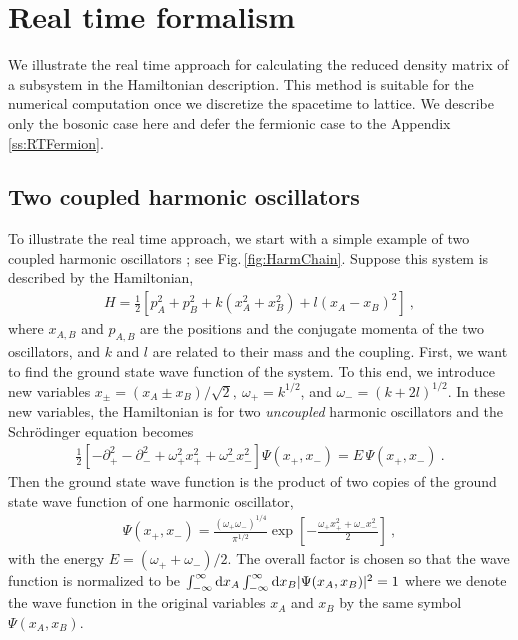 \section{Real time formalism}\label{ss:RTapproach}
We illustrate the real time approach for calculating the reduced density matrix of a subsystem in the Hamiltonian description.
This method is suitable for the numerical computation once we discretize the spacetime to lattice.
We describe only the bosonic case here and defer the fermionic case to the Appendix \ref{ss:RTFermion}.

\subsection{Two coupled harmonic oscillators}
To illustrate the real time approach, we start with a simple example of two coupled harmonic oscillators \cite{Srednicki:1993im,Bombelli:1986rw}; see Fig.\,\ref{fig:HarmChain}.
Suppose this system is described by the Hamiltonian,
\begin{align}\label{TwoHarmH}
H = \frac{1}{2}\left[ p_A^2 + p_B^2 + k(x_A^2 + x_B^2) + l (x_A - x_B)^2 \right] \ ,
\end{align}
where $x_{A,B}$ and $p_{A,B}$ are the positions and the conjugate momenta of the two oscillators, and $k$ and $l$ are related to their mass and the coupling.
First, we want to find the ground state wave function of the system.
To this end, we introduce new variables $x_\pm = (x_A \pm x_B)/\sqrt{2},~ \omega_+ = k^{1/2}$, and $\omega_- = (k + 2l)^{1/2}$.
In these new variables, the Hamiltonian is for two \emph{uncoupled} harmonic oscillators and the Schr{\"o}dinger equation becomes
\begin{align}
	 \frac{1}{2}\left[ - \partial_+^2 - \partial_-^2 + \omega_+^2 x_+^2 + \omega_-^2 x_-^2\right] \Psi (x_+, x_-) = E\, \Psi (x_+, x_-)  \ .
\end{align}
Then the ground state wave function is the product of two copies of the ground state wave function of one harmonic oscillator,
\begin{align}\label{TwoHarmGS}
\Psi  (x_+, x_-) = \frac{(\omega_+ \omega_-)^{1/4}}{\pi^{1/2}} \exp\left[ - \frac{\omega_+ x_+^2 + \omega_- x_-^2}{2}\right] \ ,
\end{align}
with the energy $E = (\omega_+ + \omega_-)/2$.
The overall factor is chosen so that the wave function is normalized to be $\int_{-\infty}^\infty \mathrm{d} x_A \int_{-\infty}^\infty \mathrm{d} x_B |\Psi (x_A, x_B)|^2 = 1$ where we denote the wave function in the original variables $x_A$ and $x_B$ by the same symbol $\Psi (x_A, x_B)$.

